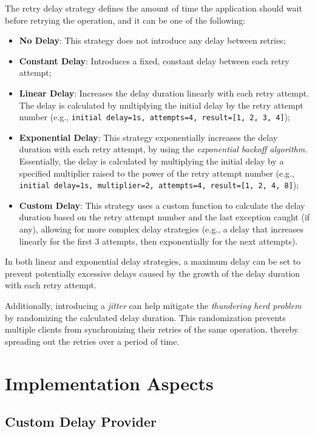 The retry delay strategy defines the amount of time the application should wait before retrying the operation, and it can be one of the following:

\begin{itemize}
    \item \textbf{No Delay}: This strategy does not introduce any delay between retries;
    \item \textbf{Constant Delay}: Introduces a fixed, constant delay between each retry attempt;
    \item \textbf{Linear Delay}: Increases the delay duration linearly with each retry attempt.
    The delay is calculated by multiplying the initial delay by the retry attempt number
    (e.g., \texttt{initial delay=1s, attempts=4, result=[1, 2, 3, 4]});
    \item \textbf{Exponential Delay}: This strategy exponentially increases the delay duration with each retry attempt,
    by using the \textit{exponential backoff algorithm}.
    Essentially, the delay is calculated by multiplying the initial delay by a specified multiplier raised to the power of the retry attempt number (e.g., \texttt{initial delay=1s, multiplier=2, attempts=4, result=[1, 2, 4, 8]});
    \item \textbf{Custom Delay}: This strategy uses a custom function to calculate the delay duration based on the retry attempt number and the last exception caught (if any), allowing for more complex delay strategies (e.g., a delay that increases linearly for the first 3 attempts, then exponentially for the next attempts).
\end{itemize}

In both linear and exponential delay strategies,
a maximum delay can be set
to prevent potentially excessive delays caused by the growth of the delay duration with each retry attempt.

Additionally,
introducing a \textit{jitter} can help
mitigate the \textit{thundering herd problem} by randomizing the calculated delay duration.
This randomization prevents multiple clients from synchronizing their retries of the same operation,
thereby spreading out the retries over a period of time.


\section{Implementation Aspects}\label{sec:retry-implementation-aspects}

\subsection{Custom Delay Provider}\label{subsec:retry-custom-delay-provider}

